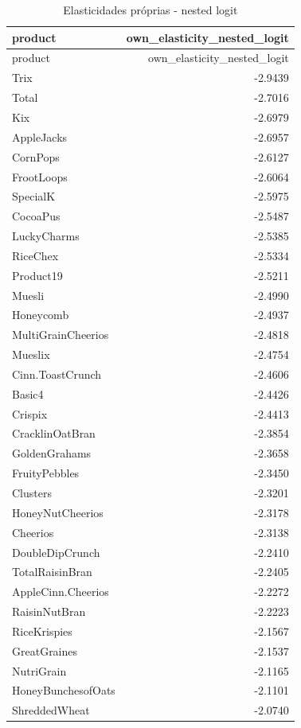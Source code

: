 \begingroup
\scriptsize
\begin{longtable}{@{}lr@{}}
\caption{Elasticidades próprias - nested logit}\label{tab:own-elas-nested}\\
\toprule
product & own\_elasticity\_nested\_logit \\
\midrule
\endfirsthead
\toprule
product & own\_elasticity\_nested\_logit \\
\midrule
\endhead
Trix & -2.9439 \\
Total & -2.7016 \\
Kix & -2.6979 \\
AppleJacks & -2.6957 \\
CornPops & -2.6127 \\
FrootLoops & -2.6064 \\
SpecialK & -2.5975 \\
CocoaPus & -2.5487 \\
LuckyCharms & -2.5385 \\
RiceChex & -2.5334 \\
Product19 & -2.5211 \\
Muesli & -2.4990 \\
Honeycomb & -2.4937 \\
MultiGrainCheerios & -2.4818 \\
Mueslix & -2.4754 \\
Cinn.ToastCrunch & -2.4606 \\
Basic4 & -2.4426 \\
Crispix & -2.4413 \\
CracklinOatBran & -2.3854 \\
GoldenGrahams & -2.3658 \\
FruityPebbles & -2.3450 \\
Clusters & -2.3201 \\
HoneyNutCheerios & -2.3178 \\
Cheerios & -2.3138 \\
DoubleDipCrunch & -2.2410 \\
TotalRaisinBran & -2.2405 \\
AppleCinn.Cheerios & -2.2272 \\
RaisinNutBran & -2.2223 \\
RiceKrispies & -2.1567 \\
GreatGraines & -2.1537 \\
NutriGrain & -2.1165 \\
HoneyBunchesofOats & -2.1101 \\
ShreddedWheat & -2.0740 \\

\end{longtable}
